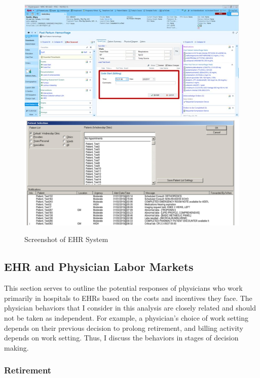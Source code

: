 \documentclass[12pt]{article}
\begin{document}
\begin{figure}[ht]
    \centering
    \captionsetup{width=.4\linewidth}
    \caption{Screenshot of EHR System}
    \includegraphics[scale=.4]{graphics/epic-ehr-screenshot.jpg}
    \includegraphics[scale=.11]{graphics/EHRimage2.jpg}
    \label{fig:EPIC}
\end{figure}


\subsection{EHR and Physician Labor Markets}

This section serves to outline the potential responses of physicians who work primarily in hospitals to EHRs based on the costs and incentives they face. The physician behaviors that I consider in this analysis are closely related and should not be taken as independent. For example, a physician's choice of work setting depends on their previous decision to prolong retirement, and billing activity depends on work setting. Thus, I discuss the behaviors in stages of decision making. 

\subsubsection{Retirement}
\end{document}
